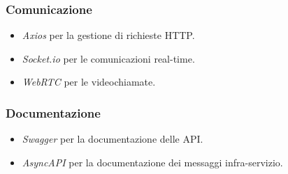 \subsubsection{Comunicazione}
\begin{itemize}
    \item \textit{Axios} per la gestione di richieste HTTP.
    \item \textit{Socket.io} per le comunicazioni real-time.
    \item \textit{WebRTC} per le videochiamate.
\end{itemize}

\subsubsection{Documentazione}
\begin{itemize}
    \item \textit{Swagger} per la documentazione delle API.
    \item \textit{AsyncAPI} per la documentazione dei messaggi infra-servizio.
\end{itemize}
